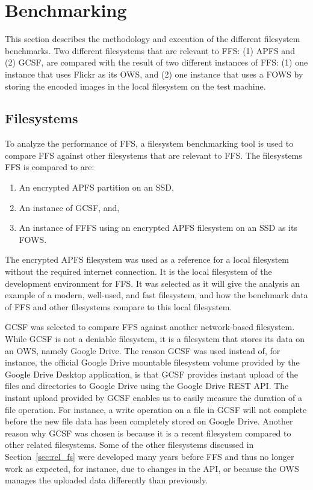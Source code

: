 \section{Benchmarking}
This section describes the methodology and execution of the different filesystem benchmarks. Two different filesystems that are relevant to \gls{FFS}: (1) \gls{APFS} and (2) \gls{GCSF}, are compared with the result of two different instances of \gls{FFS}: (1) one instance that uses Flickr as its \gls{OWS}, and (2) one instance that uses a \gls{FOWS} by storing the encoded images in the local filesystem on the test machine. 

\subsection{Filesystems}
To analyze the performance of \gls{FFS}, a filesystem benchmarking tool is used to compare \gls{FFS} against other filesystems that are relevant to \gls{FFS}. The filesystems \gls{FFS} is compared to are:
\begin{enumerate}
	\item An encrypted \gls{APFS} partition on an SSD,
	\item An instance of \gls{GCSF}, and,
	\item An instance of \gls{FFFS} using an encrypted \gls{APFS} filesystem on an SSD as its \gls{FOWS}.
\end{enumerate}
The encrypted \gls{APFS} filesystem was used as a reference for a local filesystem without the required internet connection. It is the local filesystem of the development environment for \gls{FFS}. It was selected as it will give the analysis an example of a modern, \mbox{well-used}, and fast filesystem, and how the benchmark data of \gls{FFS} and other filesystems compare to this local filesystem.

\gls{GCSF} was selected to compare \gls{FFS} against another \mbox{network-based} filesystem. While \gls{GCSF} is not a deniable filesystem, it is a filesystem that stores its data on an \gls{OWS}, namely Google Drive. The reason \gls{GCSF} was used instead of, for instance, the official Google Drive mountable filesystem volume provided by the Google Drive Desktop application, is that \gls{GCSF} provides instant upload of the files and directories to Google Drive using the Google Drive REST \gls{API}. The instant upload provided by \gls{GCSF} enables us to easily measure the duration of a file operation. For instance, a write operation on a file in \gls{GCSF} will not complete before the new file data has been completely stored on Google Drive. Another reason why \gls{GCSF} was chosen is because it is a recent filesystem compared to other related filesystems. Some of the other filesystems discussed in Section~\ref{sec:rel_fs} were developed many years before \gls{FFS} and thus no longer work as expected, for instance, due to changes in the \gls{API}, or because the \gls{OWS} manages the uploaded data differently than previously.

